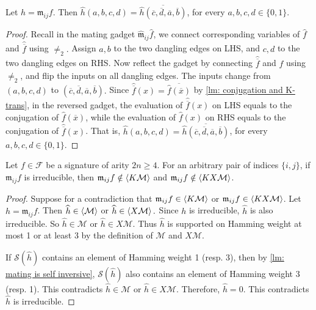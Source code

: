 \begin{lemma}\label{lm: mating is self inversive}
    Let $h=\mathfrak{m}_{ij}f$.
    Then $\widehat{h}(a,b,c,d)=\overline{\widehat{h}(\overline{c},\overline{d},\overline{a},\overline{b})}$, for every $a,b,c,d\in \{0,1\}.$
\end{lemma}
\begin{proof}
    
    Recall in the mating gadget $\widehat{\mathfrak{m}}_{ij}\widehat{f}$, we connect corresponding variables of $\widehat{f}$ and $\widehat{\overline{f}}$ using $\neq_2.$
    Assign $a,b$ to the two dangling edges on LHS, and $c,d$ to the two dangling edges on RHS.
    Now reflect the gadget by connecting $\widehat{\overline{f}}$ and $\widehat{f}$ using $\neq_2$, and flip the inputs on all dangling edges.
    The inputs change from $(a,b,c,d)$ to $(\overline{c},\overline{d},\overline{a},\overline{b}).$
    Since $\widehat{\overline{f}}(x)=\overline{\widehat{f}(\overline{x})}$ by \cref{lm: conjugation and K-trans},
    in the reversed gadget, the evaluation of $\widehat{\overline{f}}(x)$ on LHS equals to the conjugation of $\widehat{f}(\overline{x})$, while the evaluation of $\widehat{f}(x)$ on RHS equals to the conjugation of $\widehat{\overline{f}}(x)$.
    That is, $\widehat{h}(a,b,c,d)=\overline{\widehat{h}(\overline{c},\overline{d},\overline{a},\overline{b})}$, for every $a,b,c,d\in \{0,1\}.$
\end{proof}

\begin{lemma}\label{lm: 2nd-Orth M and XM cannot happen}
    Let $f\in \mathcal{F}$ be a signature of arity $2n\ge 4$.
    For an arbitrary pair of indices $\{i,j\}$, if $\mathfrak{m}_{ij}f$ is irreducible, 
    then $\mathfrak{m}_{ij}f\notin \braket{K\mathcal{M}}$ and $\mathfrak{m}_{ij}f\notin \braket{KX\mathcal{M}}$.
\end{lemma}


\begin{proof}
    Suppose for a contradiction that $\mathfrak{m}_{ij}f\in \braket{K\mathcal{M}}$ or $\mathfrak{m}_{ij}f\in \braket{KX\mathcal{M}}$.
    Let $h=\mathfrak{m}_{ij}f$.
    Then $\widehat{h}\in \braket{\mathcal{M}}$ or $\widehat{h}\in \braket{X\mathcal{M}}.$
    Since $h$ is irreducible, $\widehat{h}$ is also irreducible.
    So $\widehat{h}\in \mathcal{M}$ or $\widehat{h}\in X\mathcal{M}.$
    Thus $\widehat{h}$ is supported on Hamming weight at most 1 or at least 3 by the definition of $\mathcal{M}$ and $X\mathcal{M}$.
    
    
    If $\mathscr{S}(\widehat{h})$ contains an element of Hamming weight 1 (resp. 3), then by \cref{lm: mating is self inversive}, $\mathscr{S}(\widehat{h})$ also contains an element of Hamming weight 3 (resp. 1).
    This contradicts $\widehat{h}\in {\mathcal{M}}$ or $\widehat{h}\in {X\mathcal{M}}.$
    Therefore, $\widehat{h}=0$.
    This contradicts $\widehat{h}$ is irreducible.
\end{proof}


